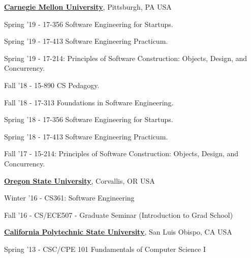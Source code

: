\documentclass[10pt]{article}
\begin{document}
\begin{outerlist}
\item[] \href{https://www.cmu.edu/}{\textbf{Carnegie Mellon University}},
Pittsburgh, PA USA 
            \begin{innerlist}
             \item Spring '19 - 17-356 Software Engineering for Startups. 
              \item Spring '19 - 17-413 Software Engineering Practicum.
            \item Spring '19 - 17-214: Principles of Software Construction: Objects, Design, and Concurrency. 
            \item Fall '18 - 15-890 CS Pedagogy.
            \item Fall '18 - 17-313 Foundations in Software Engineering. 
             \item Spring '18 - 17-356 Software Engineering for Startups. 
              \item Spring '18 - 17-413 Software Engineering Practicum.
             \item Fall '17 - 15-214: Principles of Software Construction: Objects, Design, and Concurrency. 
\end{innerlist}





\item[]\href{http://www.oregonstate.edu/}{\textbf{Oregon State University}},
Corvallis, OR USA
             \begin{innerlist}
             \item Winter '16 - CS361: Software Engineering
             \item Fall '16 - CS/ECE507 - Graduate Seminar (Introduction to Grad School)
\end{innerlist}

\item[] \href{http://www.calpoly.edu/}{\textbf{California Polytechnic State University}},
San Luis Obispo, CA USA
             \begin{innerlist}
             \item Spring '13 - CSC/CPE 101 Fundamentals of Computer Science I  
\end{innerlist}
\end{outerlist}
\end{document}
